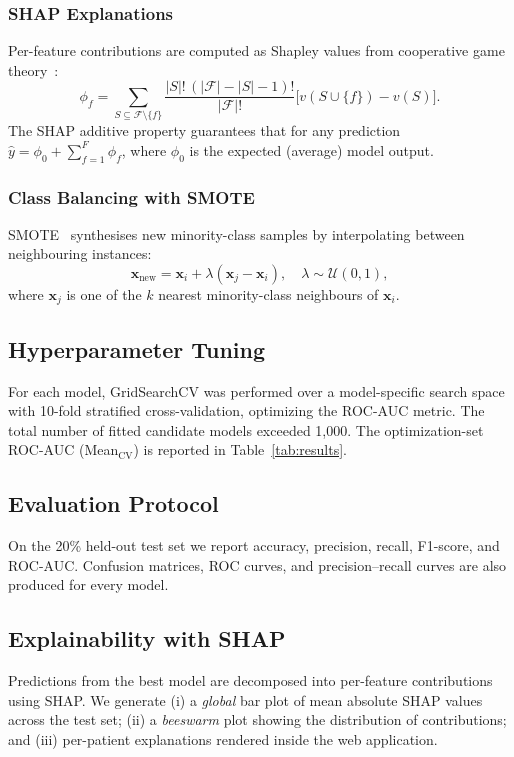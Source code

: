 \documentclass[conference]{IEEEtran}
\begin{document}
\subsubsection{SHAP Explanations}
Per-feature contributions are computed as Shapley values from cooperative game theory~\cite{lundberg2017unified}:
\begin{equation}
\phi_f = \!\!\!\sum_{S \subseteq \mathcal{F}\setminus\{f\}}\!\!\frac{|S|!\,(|\mathcal{F}| - |S| - 1)!}{|\mathcal{F}|!}\bigl[v(S \cup \{f\}) - v(S)\bigr].
\end{equation}
The SHAP additive property guarantees that for any prediction
$\hat{y} = \phi_0 + \sum_{f=1}^{F}\phi_f$, where $\phi_0$ is the expected (average) model output.

\subsubsection{Class Balancing with SMOTE}
SMOTE~\cite{chawla2002smote} synthesises new minority-class samples by interpolating between neighbouring instances:
\begin{equation}
\mathbf{x}_{\text{new}} = \mathbf{x}_i + \lambda(\mathbf{x}_j - \mathbf{x}_i), \quad \lambda \sim \mathcal{U}(0, 1),
\end{equation}
where $\mathbf{x}_j$ is one of the $k$ nearest minority-class neighbours of $\mathbf{x}_i$.

\subsection{Hyperparameter Tuning}
For each model, GridSearchCV was performed over a model-specific search space with 10-fold stratified cross-validation, optimizing the ROC-AUC metric. The total number of fitted candidate models exceeded 1{,}000. The optimization-set ROC-AUC (Mean$_{\text{CV}}$) is reported in Table~\ref{tab:results}.

\subsection{Evaluation Protocol}
On the 20\% held-out test set we report accuracy, precision, recall, F1-score, and ROC-AUC. Confusion matrices, ROC curves, and precision--recall curves are also produced for every model.

\subsection{Explainability with SHAP}
Predictions from the best model are decomposed into per-feature contributions using SHAP. We generate (i) a \emph{global} bar plot of mean absolute SHAP values across the test set; (ii) a \emph{beeswarm} plot showing the distribution of contributions; and (iii) per-patient explanations rendered inside the web application.
\end{document}

